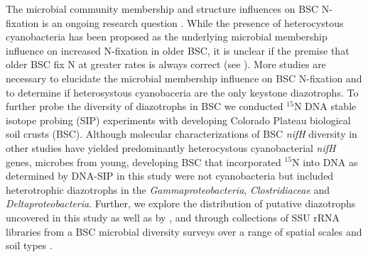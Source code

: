 The microbial community membership and structure influences on BSC N-fixation is an ongoing research question \cite{Belnap28062013}. While the presence of heterocystous cyanobacteria has been proposed as the underlying microbial membership influence on increased N-fixation in older BSC, it is unclear if the premise that older BSC fix N at greater rates is always correct (see \citet{15643930}). More studies are necessary to elucidate the microbial membership influence on BSC N-fixation and to determine if  heterosystous cyanobaceria are the only keystone diazotrophs. To further probe the diversity of diazotrophs in BSC we conducted $^{15}$N DNA stable isotope probing (SIP) experiments with developing Colorado Plateau biological soil crusts (BSC). Although molecular characterizations of BSC \textit{nifH} diversity in other studies have yielded predominantly heterocystous cyanobacterial \textit{nifH} genes, microbes from young, developing BSC that incorporated $^{15}$N into DNA as determined by DNA-SIP in this study were not cyanobacteria but included heterotrophic diazotrophs in the \textit{Gammaproteobacteria}, \textit{Clostridiaceae} and \textit{Deltaproteobacteria}. Further, we explore the distribution of putative diazotrophs uncovered in this study as well as by \citet{14766579}, \citet{Yeager} and \citet{Yeager_2012} through collections of SSU rRNA libraries from a BSC microbial diversity surveys over a range of spatial scales and soil types \cite{Garcia_Pichel_2013, Steven_2013}.  